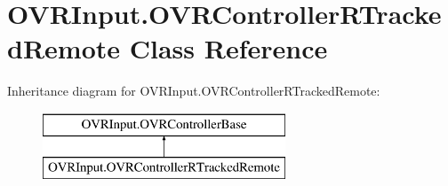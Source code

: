 \hypertarget{class_o_v_r_input_1_1_o_v_r_controller_r_tracked_remote}{}\section{O\+V\+R\+Input.\+O\+V\+R\+Controller\+R\+Tracked\+Remote Class Reference}
\label{class_o_v_r_input_1_1_o_v_r_controller_r_tracked_remote}
Inheritance diagram for O\+V\+R\+Input.\+O\+V\+R\+Controller\+R\+Tracked\+Remote\+:\begin{figure}[H]
\begin{center}
\leavevmode
\includegraphics[height=2.000000cm]{class_o_v_r_input_1_1_o_v_r_controller_r_tracked_remote}
\end{center}
\end{figure}
